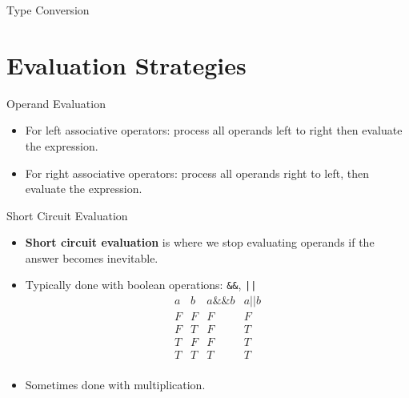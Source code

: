 \documentclass[handout]{beamer}
\newenvironment{code}{%
 \VerbatimEnvironment
 \begin{adjustbox}{max width=\textwidth, max height=0.7\textheight}
 \begin{BVerbatim}
  }{
  \end{BVerbatim}
 \end{adjustbox}
}
\begin{document}
\begin{frame}[fragile]{Type Conversion}
\end{frame}

\section{Evaluation Strategies}
\begin{frame}{Operand Evaluation}
    \begin{itemize}
        \item For left associative operators: process all operands left to right then evaluate the expression.
        \item For right associative operators: process all operands right to left, then evaluate the expression.
    \end{itemize}
\end{frame}

\begin{frame}{Short Circuit Evaluation}
    \begin{itemize}
        \item \textbf{Short circuit evaluation} is where we stop evaluating operands if the answer becomes inevitable.
        \item Typically done with boolean operations: \texttt{&&}, \texttt{||}
        \[
        \begin{array}{cc|c|c}
        a & b & a \&\& b & a || b \\
        \hline
        F & F & F & F \\
        F & T & F & T \\
        T & F & F & T \\
        T & T & T & T \\
        \end{array}
        \]
        \item Sometimes done with multiplication.
    \end{itemize}
\end{frame}
\end{document}
